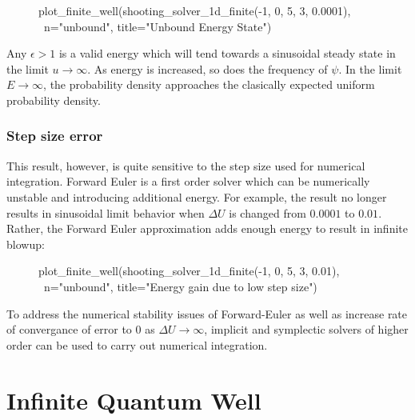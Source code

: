 \documentclass{article}
\begin{document}
\begin{figure}[H]
\begin{sageblock}
plot_finite_well(shooting_solver_1d_finite(-1, 0, 5, 3, 0.0001), \
                      n="unbound", title="Unbound Energy State")
\end{sageblock}
\vspace{-.1in}
\centering
{}
\end{figure}

Any $\epsilon > 1$ is a valid energy which will tend towards a sinusoidal steady
state in the limit $u \rightarrow \infty$. As energy is increased, so does the
frequency of $\psi$. In the limit $E \rightarrow \infty$, the probability
density approaches the clasically expected uniform probability density. 

\subsubsection{Step size error}
This result, however, is quite sensitive to the step size used for numerical
integration. Forward Euler is a first order solver which can be numerically
unstable and introducing additional energy. For example, the result no longer
results in sinusoidal limit behavior when $\Delta U$ is changed from $0.0001$
to $0.01$.  Rather, the Forward Euler approximation adds enough energy to
result in infinite blowup:

\begin{figure}[H]
\begin{sageblock}
plot_finite_well(shooting_solver_1d_finite(-1, 0, 5, 3, 0.01), \
                      n="unbound", title="Energy gain due to low step size")
\end{sageblock}
\vspace{-.1in}
\centering
{}
\end{figure}

To address the numerical stability issues of Forward-Euler as well as increase
rate of convergance of error to $0$ as $\Delta U \rightarrow \infty$, implicit
and symplectic solvers of higher order can be used to carry out numerical
integration.

\section{Infinite Quantum Well}
\end{document}
